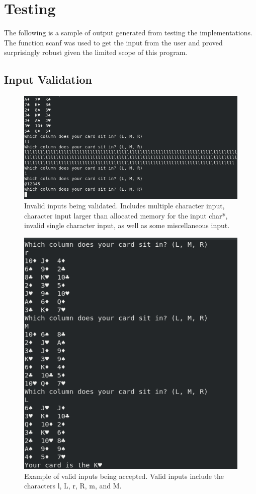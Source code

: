 \documentclass[11]{article}
\begin{document}
	\section{Testing}
		The following is a sample of output generated from testing the implementations. The function scanf was used to get the input from the user and proved surprisingly robust given the limited scope of this program.
			\subsection{Input Validation}
				\begin{figure}[h!]
				
					\caption{Invalid inputs being validated. Includes multiple character input, character input larger than allocated memory for the input char*, invalid single character input, as well as some miscellaneous input.}
					\centering
					\includegraphics[scale=0.45]{IndexInvalidInput.png}
				\end{figure}
				
				\begin{figure}[h!]
					\caption{Example of valid inputs being accepted. Valid inputs include the characters l, L, r, R, m, and M.}
					\centering
					\includegraphics[scale=0.4]{IndexValidInput.png}
				\end{figure}
				
\end{document}
